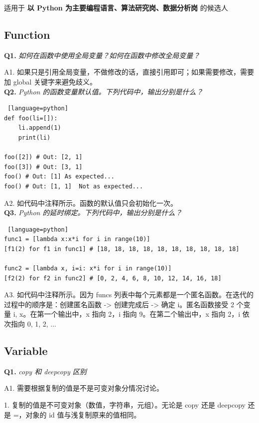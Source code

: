 \documentclass[cn,10pt,math=newtx,citestyle=gb7714-2015,bibstyle=gb7714-2015]{elegantbook}
\begin{document}
适用于 \textbf{以 Python 为主要编程语言、算法研究岗、数据分析岗}  的候选人

\subsection{Function}

\textbf{Q1.} \textit{如何在函数中使用全局变量？如何在函数中修改全局变量？}

A1. 如果只是引用全局变量，不做修改的话，直接引用即可；如果需要修改，需要加 global 关键字来避免歧义。\\

\textbf{Q2.} \textit{Python 的函数变量默认值。下列代码中，输出分别是什么？}

\begin{lstlisting} [language=python]
def foo(li=[]):
    li.append(1)
    print(li)

foo([2]) # Out: [2, 1]
foo([3]) # Out: [3, 1]
foo() # Out: [1] As expected...
foo() # Out: [1, 1]  Not as expected...
\end{lstlisting}

A2. 如代码中注释所示。函数的默认值只会初始化一次。\\


\textbf{Q3.} \textit{Python 的延时绑定。下列代码中，输出分别是什么？}

\begin{lstlisting} [language=python]
func1 = [lambda x:x*i for i in range(10)] 
[f1(2) for f1 in func1] # [18, 18, 18, 18, 18, 18, 18, 18, 18, 18]

func2 = [lambda x, i=i: x*i for i in range(10)]
[f2(2) for f2 in func2] # [0, 2, 4, 6, 8, 10, 12, 14, 16, 18] 
\end{lstlisting}

A3. 如代码中注释所示。因为 funcs 列表中每个元素都是一个匿名函数。在迭代的过程中的顺序是：创建匿名函数 -> 创建完成后 -> 确定 i。匿名函数接受 2 个变量 i, x。在第一个输出中，x 指向 2，i 指向 9。在第二个输出中，x 指向 2，i 依次指向 0, 1, 2, ...\\


\subsection{Variable}

\textbf{Q1.} \textit{copy 和 deepcopy 区别}

A1. 需要根据复制的值是不是可变对象分情况讨论。

1. 复制的值是不可变对象（数值，字符串，元组）。无论是 copy 还是 deepcopy 还是 =，对象的 id 值与浅复制原来的值相同。
\end{document}
